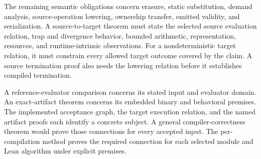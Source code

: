 \documentclass[11pt]{article}
\begin{document}
The remaining semantic obligations concern erasure, static substitution, demand analysis, source-operation lowering, ownership transfer, emitted validity, and serialization.  A source-to-target theorem must state the selected source evaluation relation, trap and divergence behavior, bounded arithmetic, representation, resources, and runtime-intrinsic observations.  For a nondeterministic target relation, it must constrain every allowed target outcome covered by the claim.  A source termination proof also needs the lowering relation before it establishes compiled termination.

A reference-evaluator comparison concerns its stated input and evaluator domain.  An exact-artifact theorem concerns its embedded binary and behavioral premises.  The implemented acceptance graph, the target execution relation, and the named artifact proofs each identify a concrete subject.  A general compiler-correctness theorem would prove those connections for every accepted input.  The per-compilation method proves the required connection for each selected module and Lean algorithm under explicit premises.
\end{document}
